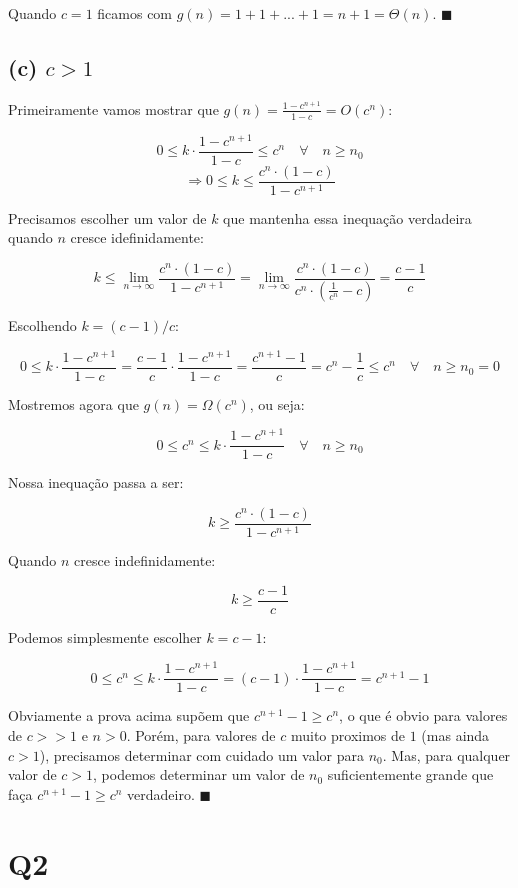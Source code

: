 \documentclass[12pt, a4paper]{article}
\begin{document}
Quando $c=1$ ficamos com $g(n)=1+1+...+1=n+1=\Theta(n)$. $\blacksquare$

\subsection*{(c) $c>1$}

Primeiramente vamos mostrar que $g(n)=\frac{1-c^{n+1}}{1-c}=O(c^n)$:

\[ 0 \leq k \cdot \frac{1-c^{n+1}}{1-c} \leq c^n \quad \forall \quad n \geq n_0 \]
\[ \Rightarrow 0 \leq k \leq \frac{c^n \cdot (1-c)}{1-c^{n+1}} \]

Precisamos escolher um valor de $k$ que mantenha essa inequação verdadeira quando $n$ cresce idefinidamente:

\[
k \leq
\lim_{n \to \infty}
\frac{c^n \cdot (1-c)}{1-c^{n+1}}
=\lim_{n \to \infty}
\frac{c^n \cdot (1-c)}{c^n \cdot (\frac{1}{c^n} - c)}
= \frac{c-1}{c}
\]

Escolhendo $k=(c-1)/c$:

\[
0
\leq k \cdot \frac{1-c^{n+1}}{1-c}
=\frac{c-1}{c} \cdot \frac{1-c^{n+1}}{1-c}
=\frac{c^{n+1}-1}{c}
=c^n - \frac{1}{c}
\leq c^n \quad \forall \quad n \geq n_0 = 0
\]

Mostremos agora que $g(n)=\Omega(c^n)$, ou seja:

\[ 0 \leq c^n \leq k \cdot \frac{1-c^{n+1}}{1-c} \quad \forall \quad n \geq n_0 \]

Nossa inequação passa a ser:

\[ k \geq \frac{c^n \cdot (1-c)}{1-c^{n+1}} \]

Quando $n$ cresce indefinidamente:

\[ k \geq \frac{c-1}{c} \]

Podemos simplesmente escolher $k=c-1$:

\[
0
\leq c^n
\leq k \cdot \frac{1-c^{n+1}}{1-c}
=(c-1) \cdot \frac{1-c^{n+1}}{1-c}
=c^{n+1}-1
\]

Obviamente a prova acima supõem que $c^{n+1}-1 \geq c^n$, o que é obvio para valores de $c >> 1$ e $n>0$. Porém, para valores de $c$ muito proximos de $1$ (mas ainda $c>1$), precisamos determinar com cuidado um valor para $n_0$. Mas, para qualquer valor de $c>1$, podemos determinar um valor de $n_0$ suficientemente grande que faça $c^{n+1}-1 \geq c^n$ verdadeiro. $\blacksquare$




\section*{Q2}
\end{document}
